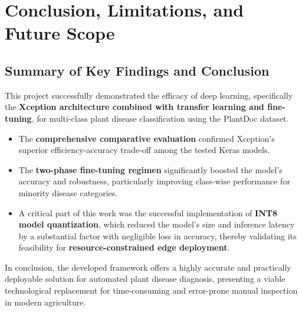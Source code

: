 \documentclass[12pt, a4paper]{report}
\begin{document}
\chapter{Conclusion, Limitations, and Future Scope}
\label{chap:conclusion}

\section{Summary of Key Findings and Conclusion}
\label{sec:conclusion}
\noindent
This project successfully demonstrated the efficacy of deep learning, specifically the \textbf{Xception architecture combined with transfer learning and fine-tuning}, for multi-class plant disease classification using the PlantDoc dataset.
\begin{itemize}
    \item The \textbf{comprehensive comparative evaluation} confirmed Xception's superior efficiency-accuracy trade-off among the tested Keras models.
    \item The \textbf{two-phase fine-tuning regimen} significantly boosted the model's accuracy and robustness, particularly improving class-wise performance for minority disease categories.
    \item A critical part of this work was the successful implementation of \textbf{INT8 model quantization}, which reduced the model's size and inference latency by a substantial factor with negligible loss in accuracy, thereby validating its feasibility for \textbf{resource-constrained edge deployment}.
\end{itemize}
\noindent %
In conclusion, the developed framework offers a highly accurate and practically deployable solution for automated plant disease diagnosis, presenting a viable technological replacement for time-consuming and error-prone manual inspection in modern agriculture.
\end{document}
